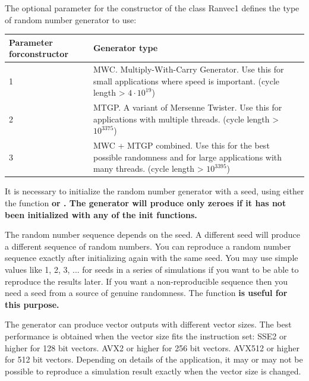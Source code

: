 \documentclass[11pt,a4paper,oneside,openright]{report}
\newcommand{\vspacesmall}{\vspace{3mm}}
\newcommand{\codei}[1]{\bfseries \ttfamily{#1}\normalfont}
\begin{document}
The optional parameter for the constructor of the class Ranvec1 defines the type of random number generator to use:
\vspacesmall

\begin{tabular}{|p{30mm}|p{120mm}|}
\hline
\bfseries Parameter for\newline constructor & \bfseries Generator type \\ \hline
1 & MWC. Multiply-With-Carry Generator. Use this for small applications where speed is important. \newline
(cycle length \textgreater{} $4 \cdot 10^{19}$) \\ \hline

2 & MTGP. A variant of Mersenne Twister. Use this for applications with multiple threads. \newline
(cycle length \textgreater{} $10^{3375}$) \\ \hline

3 & MWC + MTGP combined. Use this for the best possible randomness and for large applications with many threads. \newline
(cycle length \textgreater{} $10^{3395}$) \\ \hline
\end{tabular}
\vspacesmall

It is necessary to initialize the random number generator with a seed, using either the function \codei{init} or \codei{initByArray}. The generator will produce only zeroes if it has not been initialized with any of the init functions.
\vspacesmall

The random number sequence depends on the seed. A different seed will produce a different sequence of random numbers. You can reproduce a random number sequence exactly after initializing again with the same seed. You may use simple values like 1, 2, 3, ... for seeds in a series of simulations if you want to be able to reproduce the results later. If you want a non-reproducible sequence then you need a seed from a source of genuine randomness. The function \codei{physicalSeed} is useful for this purpose.
\vspacesmall

The generator can produce vector outputs with different vector sizes. The best performance is obtained when the vector size fits the instruction set: SSE2 or higher for 128 bit vectors. AVX2 or higher for 256 bit vectors. AVX512 or higher for 512 bit vectors. Depending on details of the application, it may or may not be possible to reproduce a simulation result exactly when the vector size is changed.
\vspacesmall
\end{document}
